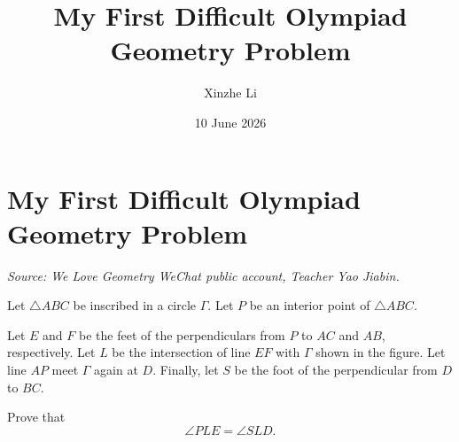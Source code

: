 \documentclass[11pt]{scrartcl}
\title{My First Difficult Olympiad Geometry Problem}
\author{Xinzhe Li}
\date{10 June 2026}
\begin{document}
\section*{My First Difficult Olympiad Geometry Problem}

\begin{mdframed}[style=mdpurplebox,frametitle={Problem statement}]
\textit{Source: We Love Geometry WeChat public account, Teacher Yao Jiabin.}

\medskip

Let $\triangle ABC$ be inscribed in a circle $\Gamma$.
Let $P$ be an interior point of $\triangle ABC$.

Let $E$ and $F$ be the feet of the perpendiculars from $P$ to $AC$ and $AB$,
respectively. Let $L$ be the intersection of line $EF$ with $\Gamma$ shown in
the figure.
Let line $AP$ meet $\Gamma$ again at $D$.
Finally, let $S$ be the foot of the perpendicular from $D$ to $BC$.

Prove that
\[
  \angle PLE = \angle SLD.
\]
\end{mdframed}
\end{document}

